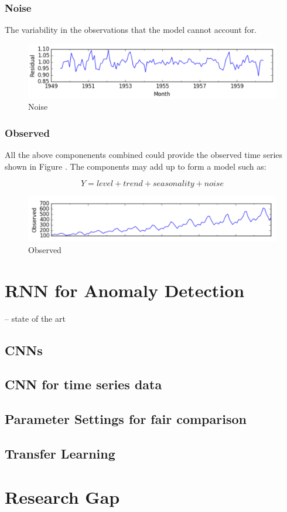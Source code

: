 \subsubsection{Noise}

The variability in the observations that the model cannot account for.

\begin{figure}[h]
	\centering
	\includegraphics[scale=0.3]{Figures/Residual}
	\decoRule
	\caption[Noise]{Noise \parencite{}}
	\label{fig:Noise}
\end{figure}

\subsubsection{Observed}

All the above componenents combined could provide the observed time series shown in Figure . The components may add up to form a model such as: 

\begin{equation}
	Y =level + trend + seasonality + noise
\end{equation}

\begin{figure}[h]
	\centering
	\includegraphics[scale=0.3]{Figures/Observed}
	\decoRule
	\caption[Observed]{Observed \parencite{}}
	\label{fig:Observed}
\end{figure}


\section{RNN for Anomaly Detection}

 -- state of the art

\subsection{CNNs}

\subsection{CNN for time series data}

\subsection{Parameter Settings for fair comparison}

\subsection{Transfer Learning}

\section{Research Gap}
